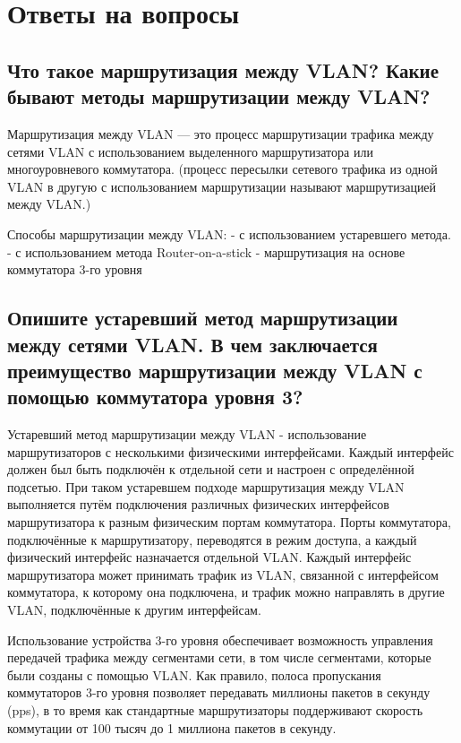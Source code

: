 \section{Ответы на вопросы}

\subsection{Что такое маршрутизация между VLAN? Какие бывают методы маршрутизации между VLAN?}

Маршрутизация между VLAN — это процесс маршрутизации
трафика между сетями VLAN с использованием выделенного
маршрутизатора или многоуровневого коммутатора. (процесс пересылки
сетевого трафика из одной VLAN в другую с использованием
маршрутизации называют маршрутизацией между VLAN.)

Способы маршрутизации между VLAN:
- с использованием устаревшего метода.
- с использованием метода Router-on-a-stick
- маршрутизация на основе коммутатора 3-го уровня

\subsection{Опишите устаревший метод маршрутизации между сетями VLAN. В чем заключается преимущество
маршрутизации между VLAN с помощью коммутатора уровня 3?}

Устаревший метод маршрутизации между VLAN - использование
маршрутизаторов с несколькими физическими интерфейсами. Каждый
интерфейс должен был быть подключён к отдельной сети и настроен с
определённой подсетью. При таком устаревшем подходе маршрутизация
между VLAN выполняется путём подключения различных физических
интерфейсов маршрутизатора к разным физическим портам коммутатора.
Порты коммутатора, подключённые к маршрутизатору, переводятся в режим
доступа, а каждый физический интерфейс назначается отдельной VLAN.
Каждый интерфейс маршрутизатора может принимать трафик из VLAN,
связанной с интерфейсом коммутатора, к которому она подключена, и
трафик можно направлять в другие VLAN, подключённые к другим
интерфейсам.

Использование устройства 3-го уровня обеспечивает возможность
управления передачей трафика между сегментами сети, в том числе
сегментами, которые были созданы с помощью VLAN. Как правило, полоса
пропускания коммутаторов 3-го уровня позволяет передавать миллионы
пакетов в секунду (pps), в то время как стандартные маршрутизаторы
поддерживают скорость коммутации от 100 тысяч до 1 миллиона пакетов в
секунду.

